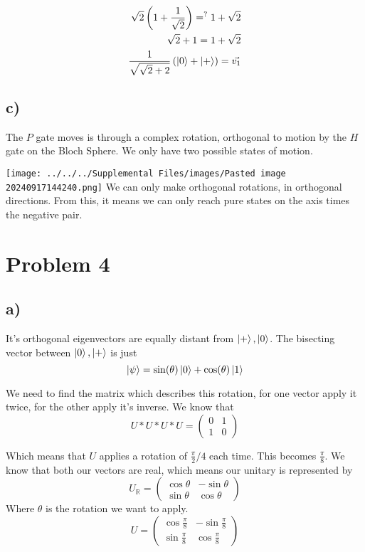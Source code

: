 \documentclass[]{article}
\begin{document}
\[
\begin{align}
\sqrt{ 2 }\left( 1+\frac{1}{\sqrt{ 2 }} \right) =^{?}1+\sqrt{ 2 } \\
\sqrt{ 2 }+1=1+\sqrt{ 2 } \\
\frac{1}{\sqrt{ \sqrt{ 2 }+2 }}\left( \ket{0} +\ket{+}  \right) =\vec{v_{1}}
\end{align} \\
\]

\hypertarget{c-2}{%
\subsection{c)}\label{c-2}}

The \(P\) gate moves is through a complex rotation, orthogonal to motion
by the \(H\) gate on the Bloch Sphere. We only have two possible states
of motion.

\texttt{[image: ../../../Supplemental Files/images/Pasted image 20240917144240.png]}
We can only make orthogonal rotations, in orthogonal directions. From
this, it means we can only reach pure states on the axis times the
negative pair.

\hypertarget{problem-4}{%
\section{Problem 4}\label{problem-4}}

\hypertarget{a-3}{%
\subsection{a)}\label{a-3}}

It's orthogonal eigenvectors are equally distant from
\(\ket{+},\ket{0}\). The bisecting vector between \(\ket{0},\ket{+}\) is
just \[
\ket{\psi}  = \sin(\theta)\ket{0} +\cos(\theta)\ket{1} 
\]

We need to find the matrix which describes this rotation, for one vector
apply it twice, for the other apply it's inverse. We know that \[
U*U*U*U =\begin{pmatrix}
0 & 1 \\
1 & 0
\end{pmatrix}
\]

Which means that \(U\) applies a rotation of \(\frac{\pi}{2}/4\) each
time. This becomes \(\frac{\pi}{8}\). We know that both our vectors are
real, which means our unitary is represented by \[
U_{\mathbb{R}} = \begin{pmatrix}
\cos \theta & -\sin \theta \\
\sin \theta & \cos \theta
\end{pmatrix}
\] Where \(\theta\) is the rotation we want to apply. \[
U = \begin{pmatrix}
\cos \frac{\pi}{8} & -\sin \frac{\pi}{8} \\
\sin \frac{\pi}{8} & \cos \frac{\pi}{8}
\end{pmatrix}
\]
\end{document}

